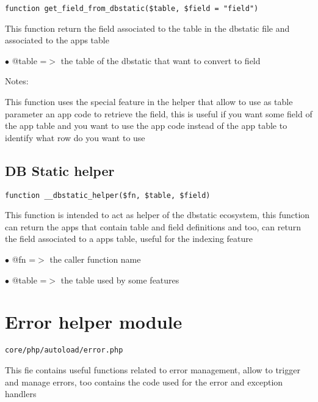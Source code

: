 \documentclass[a4paper]{book}
\begin{document}
\begin{lstlisting}
function get_field_from_dbstatic($table, $field = "field")
\end{lstlisting}

This function return the field associated to the table in the dbstatic
file and associated to the apps table

\begin{compactitem}
\item[\color{myblue}$\bullet$] @table =$>$ the table of the dbstatic that want to convert to field
\end{compactitem}

Notes:

This function uses the special feature in the helper that allow to
use as table parameter an app code to retrieve the field, this is
useful if you want some field of the app table and you want to use
the app code instead of the app table to identify what row do you
want to use

\hypertarget{toc98}{}
\subsection{DB Static helper}

\begin{lstlisting}
function __dbstatic_helper($fn, $table, $field)
\end{lstlisting}

This function is intended to act as helper of the dbstatic ecosystem, this
function can return the apps that contain table and field definitions and
too, can return the field associated to a apps table, useful for the
indexing feature

\begin{compactitem}
\item[\color{myblue}$\bullet$] @fn    =$>$ the caller function name
\item[\color{myblue}$\bullet$] @table =$>$ the table used by some features
\end{compactitem}

\hypertarget{toc99}{}
\section{Error helper module}

\begin{lstlisting}
core/php/autoload/error.php
\end{lstlisting}

This fie contains useful functions related to error management, allow to trigger and manage
errors, too contains the code used for the error and exception handlers
\end{document}

